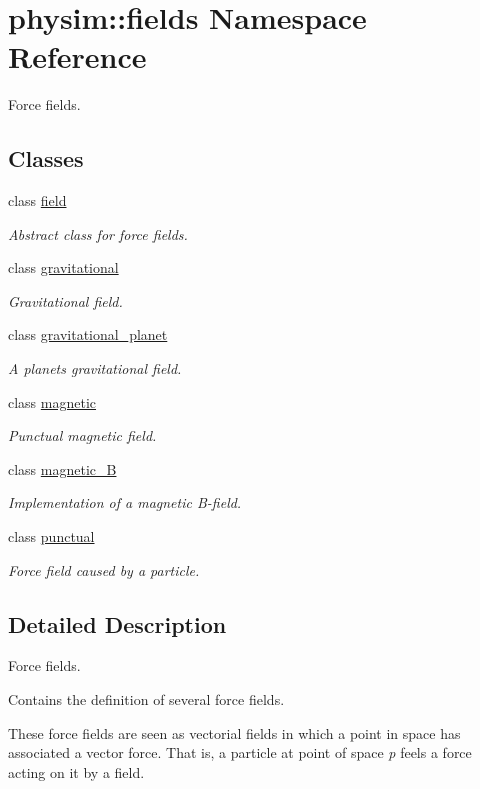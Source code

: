 \hypertarget{namespacephysim_1_1fields}{}\section{physim\+:\+:fields Namespace Reference}
\label{namespacephysim_1_1fields}


Force fields.  


\subsection*{Classes}
\begin{DoxyCompactItemize}
\item 
class \hyperlink{classphysim_1_1fields_1_1field}{field}
\begin{DoxyCompactList}\small\item\em Abstract class for force fields. \end{DoxyCompactList}\item 
class \hyperlink{classphysim_1_1fields_1_1gravitational}{gravitational}
\begin{DoxyCompactList}\small\item\em Gravitational field. \end{DoxyCompactList}\item 
class \hyperlink{classphysim_1_1fields_1_1gravitational__planet}{gravitational\+\_\+planet}
\begin{DoxyCompactList}\small\item\em A planet\textquotesingle{}s gravitational field. \end{DoxyCompactList}\item 
class \hyperlink{classphysim_1_1fields_1_1magnetic}{magnetic}
\begin{DoxyCompactList}\small\item\em Punctual magnetic field. \end{DoxyCompactList}\item 
class \hyperlink{classphysim_1_1fields_1_1magnetic__B}{magnetic\+\_\+B}
\begin{DoxyCompactList}\small\item\em Implementation of a magnetic B-\/field. \end{DoxyCompactList}\item 
class \hyperlink{classphysim_1_1fields_1_1punctual}{punctual}
\begin{DoxyCompactList}\small\item\em Force field caused by a particle. \end{DoxyCompactList}\end{DoxyCompactItemize}


\subsection{Detailed Description}
Force fields. 

Contains the definition of several force fields.

These force fields are seen as vectorial fields in which a point in space has associated a vector force. That is, a particle at point of space {\itshape p} feels a force acting on it by a field. 